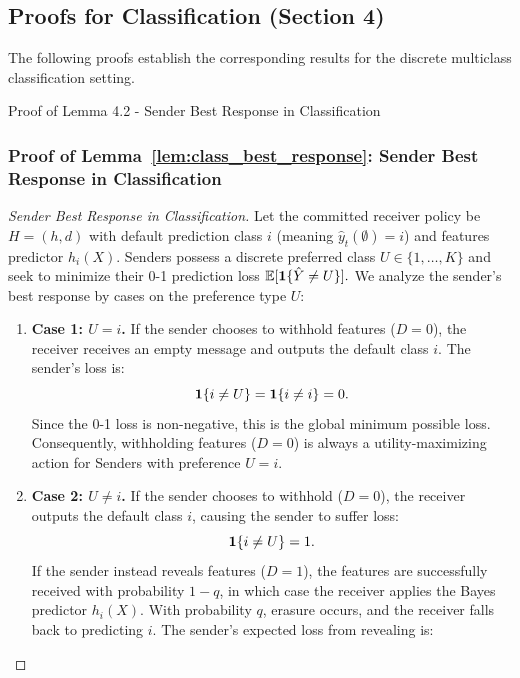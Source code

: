 \subsection{Proofs for Classification (Section 4)}
\label{subsec:proofs_classification}

The following proofs establish the corresponding results for the discrete multiclass classification setting.

\begin{sourceblock}{Proof of Lemma 4.2 - Sender Best Response in Classification}
\subsubsection*{Proof of Lemma~\ref{lem:class_best_response}: Sender Best Response in Classification}
\label{app:proof_class_best_response}
\begin{proof}[Sender Best Response in Classification]
Let the committed receiver policy be $H = (h, d)$ with default prediction class $i$ (meaning $\hat{y}_t(\emptyset) = i$) and features predictor $h_i(X)$. Senders possess a discrete preferred class $U \in \{1, \dots, K\}$ and seek to minimize their 0-1 prediction loss $\mathbb{E}[\mathbf{1}\{\hat{Y} \ne U\}].$ We analyze the sender's best response by cases on the preference type $U$:
\begin{enumerate}
    \item \textbf{Case 1: $U = i$.} If the sender chooses to withhold features ($D = 0$), the receiver receives an empty message and outputs the default class $i$. The sender's loss is:
    \begin{equation}
        \mathbf{1}\{i \ne U\} = \mathbf{1}\{i \ne i\} = 0.
    \end{equation}
    Since the 0-1 loss is non-negative, this is the global minimum possible loss. Consequently, withholding features ($D = 0$) is always a utility-maximizing action for Senders with preference $U = i$.
    \item \textbf{Case 2: $U \ne i$.} If the sender chooses to withhold ($D = 0$), the receiver outputs the default class $i$, causing the sender to suffer loss:
    \begin{equation}
        \mathbf{1}\{i \ne U\} = 1.
    \end{equation}
    If the sender instead reveals features ($D = 1$), the features are successfully received with probability $1 - q$, in which case the receiver applies the Bayes predictor $h_i(X)$. With probability $q$, erasure occurs, and the receiver falls back to predicting $i$. The sender's expected loss from revealing is:

\end{enumerate}
\end{proof}
\end{sourceblock}
